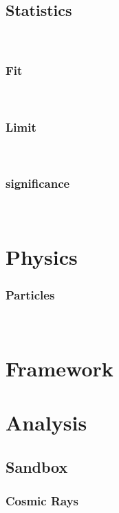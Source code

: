 \subsection{Statistics}
~\\
\subsubsection{Fit}
~\\
%
\begin{changemargin}{1.5cm}{1.5cm} 
  
\end{changemargin}
%

\subsubsection{Limit}
~\\
%
\begin{changemargin}{1.5cm}{1.5cm} 
  
\end{changemargin}
%

\subsubsection{significance}
~\\
%
\begin{changemargin}{1.5cm}{1.5cm} 
  
\end{changemargin}
%
\section{Physics}
\subsubsection{Particles}
~\\
%
\begin{changemargin}{1.5cm}{1.5cm} 
  
\end{changemargin}
%

\section{Framework}

\section{Analysis}
\subsection{Sandbox}
\subsubsection{Cosmic Rays}
